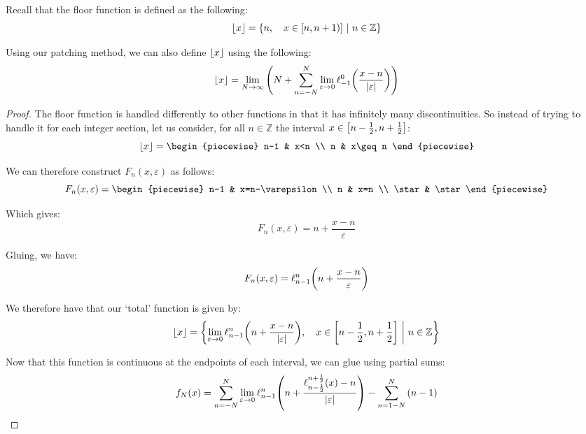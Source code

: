 \begin{example}
    \label{example:floor_sum}
    Recall that the floor function is defined as the following:
    $$
        \floor{x} = \pwobj{n}{x\in[n,n+1)]}{n\in\mathbb{Z}}
    $$

    Using our patching method, we can also define $\floor{x}$ using the following:
    $$
        \floor{x} = \lim_{N\to\infty}{\paren*{N+\sum_{n=-N}^{N}{\lim_{\varepsilon\to0}{\ell_{-1}^{0}\paren*{\frac{x-n}{\abs{\varepsilon}}}}}}}
    $$

    \begin{proof}
        The floor function is handled differently to other functions in that it has infinitely many discontinuities. So instead of trying to handle it for each integer section, let us consider, for all $n\in\mathbb{Z}$ the interval $x\in\brak*{n-\frac{1}{2},n+\frac{1}{2}}$:
        $$
            \floor{x} = \begin{piecewise}
                n-1 & x<n \\
                n & x\geq n
            \end{piecewise}
        $$

        We can therefore construct $F_n(x,\varepsilon)$ as follows:
        $$
            F_n(x,\varepsilon) = \begin{piecewise}
                n-1 & x=n-\varepsilon \\
                n & x=n \\
                \star & \star
            \end{piecewise}
        $$

        Which gives:
        $$
            F_n(x,\varepsilon) = n+\frac{x-n}{\varepsilon}
        $$

        Gluing, we have:
        $$
            F_n(x,\varepsilon)= \ell_{n-1}^{n}\paren*{n+\frac{x-n}{\varepsilon}}
        $$

        We therefore have that our `total' function is given by:
        $$
            \floor{x} = \pwobj{\lim_{\varepsilon\to0}{\ell_{n-1}^{n}\paren*{n+\frac{x-n}{\abs{\varepsilon}}}}}{x\in\brak*{n-\frac{1}{2},n+\frac{1}{2}}}{n\in\mathbb{Z}}
        $$

        Now that this function is continuous at the endpoints of each interval, we can glue using partial sums:
        $$
            f_N(x) = \sum_{n=-N}^{N}{\lim_{\varepsilon\to0}{\ell_{n-1}^{n}\paren*{n+\frac{\ell_{n-\frac{1}{2}}^{n+\frac{1}{2}}(x)-n}{\abs{\varepsilon}}}}}-\sum_{n=1-N}^{N}{\paren*{n-1}}
        $$


\end{proof}
\end{example}
